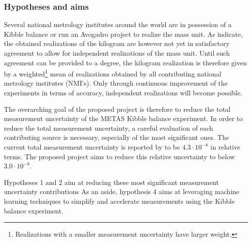 \documentclass{article}
\def\corr#1{{\color{black}{#1}}} %
\begin{document}
\subsubsection*{Hypotheses and aims}
Several national metrology institutes around the world are in possession of a Kibble balance or run an Avogadro project to realize the mass unit. As \cite{Stock_2023} indicate, the obtained realizations of the kilogram are however not yet in satisfactory agreement to allow for independent realizations of the mass unit. Until such agreement can be provided to a \corr{sufficient} degree, the kilogram realization is therefore given by a weighted\footnote{Realizations with a smaller measurement uncertainty have larger weight.} mean of realizations obtained by all contributing national metrology institutes (NMI's). Only through continuous improvement of the experiments in terms of accuracy, independent realizations will become possible.

The overarching goal of the proposed project is therefore to reduce the total measurement uncertainty of the METAS Kibble balance experiment. In order to reduce the total measurement uncertainty, a careful evaluation of each contributing source is necessary, especially of the most significant ones. The current total measurement uncertainty is reported by \cite{Eichenberger_2022} to be $4.3 \cdot 10^{-8}$ in relative terms. The proposed project aims to reduce this relative uncertainty to below $3.0 \cdot 10^{-8}$.

Hypotheses 1 and 2 aim at reducing these most significant measurement uncertainty contributions\corr{, which is a required precondition for the development of the joule balance mode constituting hypothesis 3.} As an aside, hypothesis 4 aims at leveraging machine learning techniques to simplify and accelerate measurements using the Kibble balance experiment.
\end{document}

